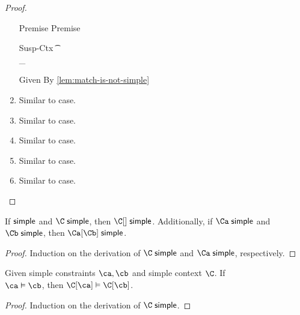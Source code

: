 \documentclass[acmsmall,screen,nonacm,review]{acmart}
\begin{document}
\begin{lemma}
\begin{proof}
\begin{enumerate}[(\roman*)]
\begin{proofcases}
	\begin{llproof}
\Hand 	  \vdashPf{\semenv}{\ca} {Premise}
\Hand     \vdashPf{\semenv}{\cb} {Premise}
	\end{llproof}

	\proofcasederivation
	  {Susp-Ctx}
	  {\Cshape \C \t \sh \\ \semenv \th \C\where{\cmatched \t \sh \cbrs}}
	  {\semenv \th \underbrace{\C\where{\cmatch \t \cbrs}}_{\ca \cand \cb}}

	\begin{llproof}
	  \simplePf{\C\where{\cmatch \t \cbrs}} {Given}
	  \nsimplePf{\C\where{\cmatch \t \cbrs}} {By \cref{lem:match-is-not-simple}}
\Hand 	  \contraPf{\semenv \th \ca, \semenv \th \cb}
	\end{llproof}

      \end{proofcases}

      \item Similar to  case.
      \item Similar to  case.
      \item Similar to  case.
      \item Similar to  case.
      \item Similar to  case.
    \end{enumerate}
  \end{proof}
\end{lemma}

\begin{lemma}
  \label{lem:compose-simple}
  If $\relax \mathrel{\mathsf{simple}}\mathclose{}$ and $\C \simple$, then $\C\where\c \simple$.
  Additionally, if $\Ca \simple$ and $\Cb \simple$, then $\Ca\where\Cb \simple$.
  \begin{proof}
    Induction on the derivation of $\C \simple$ and $\Ca \simple$, respectively.
  \end{proof}
\end{lemma}

\begin{lemma}
  \label{lem:cong-simple}
  Given simple constraints $\ca, \cb$ and simple context $\C$.
  If \\$\ca \centails \cb$, then $\C\where{\ca} \centails \C\where{\cb}$.
  \begin{proof}
    Induction on the derivation of $\C \simple$.
  \end{proof}
\end{lemma}
\end{document}
